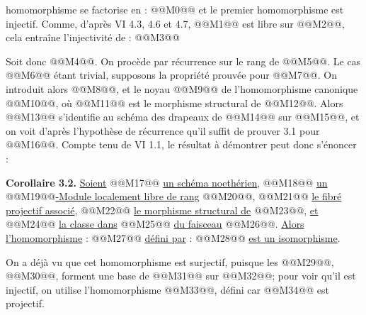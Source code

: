 
homomorphisme se factorise en :
@@M0@@
et le premier homomorphisme est injectif. Comme, d'après VI 4.3, 4.6 et 4.7, @@M1@@ est libre sur @@M2@@, cela entraîne l'injectivité de :
@@M3@@

Soit donc @@M4@@. On procède par récurrence sur le rang de @@M5@@. Le cas @@M6@@ étant trivial, supposons la propriété prouvée pour @@M7@@. On introduit alors @@M8@@, et le noyau @@M9@@ de l'homomorphisme canonique @@M10@@, où @@M11@@ est le morphisme structural de @@M12@@. Alors @@M13@@ s'identifie au schéma des drapeaux de @@M14@@ sur @@M15@@, et on voit d'après l'hypothèse de récurrence qu'il suffit de prouver 3.1 pour @@M16@@. Compte tenu de VI 1.1, le résultat à démontrer peut donc s'énoncer :

\textbf{Corollaire 3.2.} \uline{Soient} @@M17@@ \uline{un schéma noethérien}, @@M18@@ \uline{un} @@M19@@\uline{-Module localement libre de rang} @@M20@@, @@M21@@ \uline{le fibré projectif associé}, @@M22@@ \uline{le morphisme structural de} @@M23@@, \uline{et} @@M24@@ \uline{la classe dans} @@M25@@ \uline{du faisceau} @@M26@@. \uline{Alors l'homomorphisme} :
@@M27@@
\uline{défini par} :
@@M28@@
\uline{est un isomorphisme}.

On a déjà vu que cet homomorphisme est surjectif, puisque les @@M29@@, @@M30@@, forment une base de @@M31@@ sur @@M32@@; pour voir qu'il est injectif, on utilise l'homomorphisme @@M33@@, défini car @@M34@@ est projectif.
